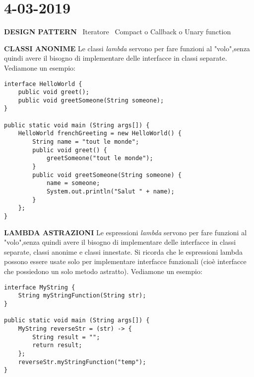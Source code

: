 

\newpage
\section{4-03-2019}
\textbf{DESIGN PATTERN} \newline
\textbullet\ Iteratore \newline
\textbullet\ Compact o Callback o Unary function 

\noindent \textbf{CLASSI ANONIME} \newline
Le classi \textit{lambda} servono per fare funzioni al "volo",senza quindi avere il bisogno di implementare delle interfacce in classi separate. Vediamone un esempio:

\begin{lstlisting}[basicstyle=\small,]
interface HelloWorld {
	public void greet();
    public void greetSomeone(String someone);
}

public static void main (String args[]) {
    HelloWorld frenchGreeting = new HelloWorld() {
        String name = "tout le monde";
        public void greet() {
            greetSomeone("tout le monde");
        }
        public void greetSomeone(String someone) {
            name = someone;
            System.out.println("Salut " + name);
        }
    };
}

\end{lstlisting}

\noindent \textbf{LAMBDA ASTRAZIONI} \newline
Le espressioni \textit{lambda} servono per fare funzioni al "volo",senza quindi avere il bisogno di implementare delle interfacce in classi separate, classi anonime e classi innestate. Si ricorda che le espressioni lambda possono essere usate solo per implementare interfacce funzionali (cioè interfacce che possiedono un solo metodo astratto). Vediamone un esempio:

\begin{lstlisting}[basicstyle=\small,]
interface MyString {
	String myStringFunction(String str);
}

public static void main (String args[]) {
	MyString reverseStr = (str) -> {
		String result = "";		
		return result;
	};
	reverseStr.myStringFunction("temp");
}
\end{lstlisting}

